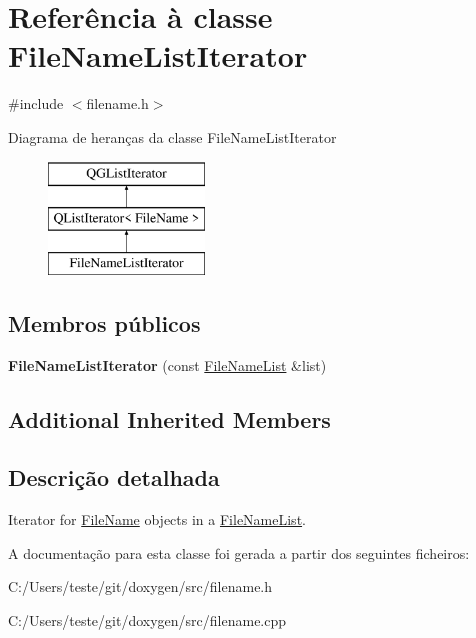 \hypertarget{class_file_name_list_iterator}{\section{Referência à classe File\-Name\-List\-Iterator}
\label{class_file_name_list_iterator}
}


{\ttfamily \#include $<$filename.\-h$>$}

Diagrama de heranças da classe File\-Name\-List\-Iterator\begin{figure}[H]
\begin{center}
\leavevmode
\includegraphics[height=3.000000cm]{class_file_name_list_iterator}
\end{center}
\end{figure}
\subsection*{Membros públicos}
\begin{DoxyCompactItemize}
\item 
\hypertarget{class_file_name_list_iterator_a285297bfdbad70eea72d7b7fd675c709}{{\bfseries File\-Name\-List\-Iterator} (const \hyperlink{class_file_name_list}{File\-Name\-List} \&list)}\label{class_file_name_list_iterator_a285297bfdbad70eea72d7b7fd675c709}

\end{DoxyCompactItemize}
\subsection*{Additional Inherited Members}


\subsection{Descrição detalhada}
Iterator for \hyperlink{class_file_name}{File\-Name} objects in a \hyperlink{class_file_name_list}{File\-Name\-List}. 

A documentação para esta classe foi gerada a partir dos seguintes ficheiros\-:\begin{DoxyCompactItemize}
\item 
C\-:/\-Users/teste/git/doxygen/src/filename.\-h\item 
C\-:/\-Users/teste/git/doxygen/src/filename.\-cpp\end{DoxyCompactItemize}
